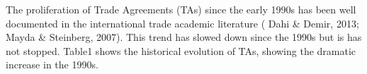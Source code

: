 The proliferation of Trade Agreements (TAs) since the early 1990s has
been well documented in the international trade academic literature
(\cite{dahi_preferential_2013} Dahi \& Demir, 2013; \cite{mayda_south-south_2007} Mayda \& Steinberg, 2007). This trend has slowed
down since the 1990s but is has not stopped. Table1 shows the historical
evolution of TAs, showing the dramatic increase in the 1990s.